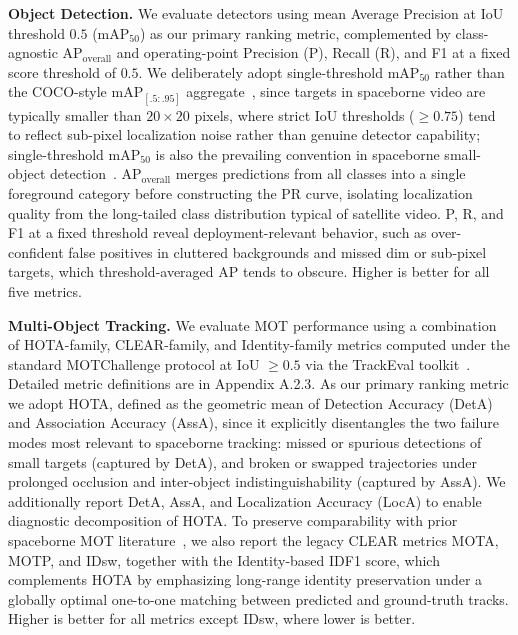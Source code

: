 \documentclass{article}
\newcommand{\subhead}[1]{\noindent\textbf{#1.}}
\begin{document}
\subhead{Object Detection} We evaluate detectors using mean Average
Precision at IoU threshold $0.5$ ($\mathrm{mAP}_{50}$) as our primary ranking
metric, complemented by class-agnostic $\mathrm{AP}_{\text{overall}}$ and
operating-point Precision (P), Recall (R), and F1 at a fixed score threshold
of $0.5$. We deliberately adopt single-threshold $\mathrm{mAP}_{50}$ rather than 
the COCO-style $\mathrm{mAP}_{[.5:.95]}$ aggregate~\citep{lin2014coco}, since targets in
spaceborne video are typically smaller than $20\times 20$ pixels, where
strict IoU thresholds ($\geq 0.75$) tend to reflect sub-pixel localization
noise rather than genuine detector capability; single-threshold
$\mathrm{mAP}_{50}$ is also the prevailing convention in spaceborne
small-object detection~\citep{Li2023SATMTB,He2022TGraM}.
$\mathrm{AP}_{\text{overall}}$ merges predictions from all classes into a
single foreground category before constructing the PR curve, isolating
localization quality from the long-tailed class distribution typical of
satellite video. P, R, and F1 at a fixed threshold reveal
deployment-relevant behavior, such as over-confident false positives in
cluttered backgrounds and missed dim or sub-pixel targets, which
threshold-averaged AP tends to obscure. Higher is better for all five
metrics.

\subhead{Multi-Object Tracking} We evaluate MOT performance using a
combination of HOTA-family, CLEAR-family, and Identity-family metrics
computed under the standard MOTChallenge protocol at IoU $\geq 0.5$ via the
TrackEval toolkit~\citep{luiten2021hota,bernardin2008clear,ristani2016idf1}.
Detailed metric definitions are in Appendix A.2.3. As our primary ranking
metric we adopt HOTA, defined as the geometric mean of Detection Accuracy
(DetA) and Association Accuracy (AssA), since it explicitly disentangles
the two failure modes most relevant to spaceborne tracking: missed or
spurious detections of small targets (captured by DetA), and broken or
swapped trajectories under prolonged occlusion and inter-object
indistinguishability (captured by AssA). We additionally report DetA, AssA,
and Localization Accuracy (LocA) to enable diagnostic decomposition of
HOTA. To preserve comparability with prior spaceborne MOT
literature~\citep{Li2023SATMTB,He2022TGraM}, we also report the
legacy CLEAR metrics MOTA, MOTP, and IDsw, together with the Identity-based
IDF1 score, which complements HOTA by emphasizing long-range identity
preservation under a globally optimal one-to-one matching between
predicted and ground-truth tracks. Higher is better for all metrics
except IDsw, where lower is better.
\end{document}
